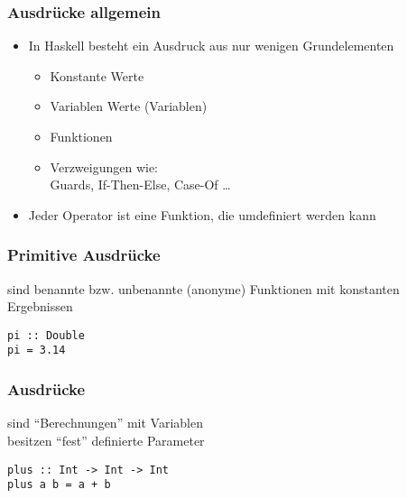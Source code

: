 \begin{frame}
\frametitle{Ausdrücke allgemein}
\begin{block}{\vspace*{-3ex}}
\begin{itemize}
  \item In Haskell besteht ein Ausdruck aus nur wenigen Grundelementen
  \begin{itemize}
    \item Konstante Werte
    \item Variablen Werte (Variablen)
    \item Funktionen
    \item Verzweigungen wie:\\Guards, If-Then-Else, Case-Of \ldots
  \end{itemize}
  \item Jeder Operator ist eine Funktion, die umdefiniert werden kann
\end{itemize}
\end{block}
\end{frame}

\begin{frame}[fragile]
\frametitle{Primitive Ausdrücke}
\begin{block}{\vspace*{-3ex}}
sind benannte bzw. unbenannte (anonyme) Funktionen mit konstanten Ergebnissen
\end{block}
\begin{lstlisting}
pi :: Double
pi = 3.14
\end{lstlisting}
\end{frame}

\begin{frame}[fragile]
\frametitle{Ausdrücke}
\begin{block}{\vspace*{-3ex}}
sind "`Berechnungen"' mit Variablen\\
besitzen "`fest"' definierte Parameter
\end{block}
\begin{lstlisting}
plus :: Int -> Int -> Int
plus a b = a + b
\end{lstlisting}
\end{frame}

